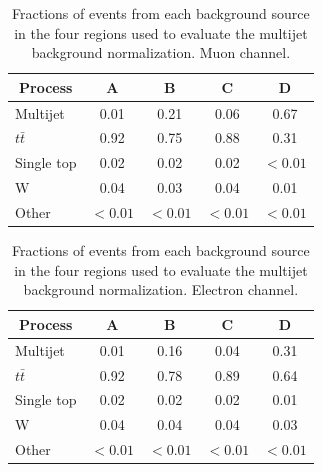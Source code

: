 \begin{table}
  \caption{Fractions of events from each background source in the four regions used to evaluate the multijet background normalization. Muon channel.}
  \centering
  \begin{tabular}{lcccc}
    \hline
    \hline
    \multicolumn{1}{c}{Process} & A  & B  & C  & D \\
    \hline
    Multijet    & 0.01     & 0.21     & 0.06     & 0.67    \\
    $t\bar t$      & 0.92     & 0.75     & 0.88     & 0.31    \\
    Single top  & 0.02     & 0.02     & 0.02     & $<0.01$ \\
    W         & 0.04     & 0.03     & 0.04     & 0.01    \\
    Other       & $<0.01$  & $<0.01$  & $<0.01$  & $<0.01$ \\
    \hline
    \hline
  \end{tabular}
  \label{table:ABCD_fractions_semimu}
\end{table}

\begin{table}
  \caption{Fractions of events from each background source in the four regions used to evaluate the multijet background normalization. Electron channel.}
  \centering
  \begin{tabular}{lcccc}
    \hline
    \hline
    \multicolumn{1}{c}{Process} & A  & B  & C  & D \\
    \hline
    Multijet    & 0.01     & 0.16     & 0.04     & 0.31    \\
    $t\bar t$      & 0.92     & 0.78     & 0.89     & 0.64    \\
    Single top  & 0.02     & 0.02     & 0.02     & 0.01    \\
    W         & 0.04     & 0.04     & 0.04     & 0.03    \\
    Other       & $<0.01$  & $<0.01$  & $<0.01$  & $<0.01$ \\
    \hline
    \hline
  \end{tabular}
  \label{table:ABCD_fractions_semie}
\end{table}

